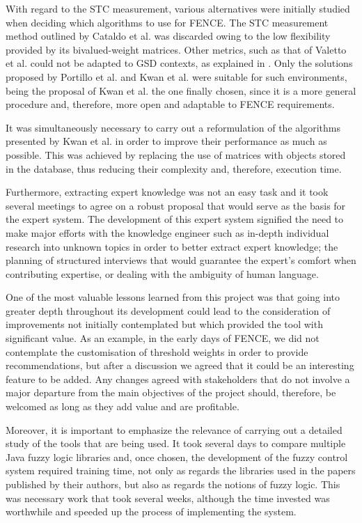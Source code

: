 With regard to the STC measurement, various alternatives were initially studied when deciding which algorithms to use for FENCE. The STC measurement method outlined by Cataldo et al. \cite{cataldo_identification_2006, cataldo_socio-technical_2008} was discarded owing to the low flexibility provided by its bivalued-weight matrices. Other metrics, such as that of Valetto et al. \cite{valetto_using_2007} could not be adapted to GSD contexts, as explained in \cite{sierra_systematic_2018}. Only the solutions proposed by Portillo et al. \cite{portillo_2014} and Kwan et al. \cite{kwan_weighted_2009, kwan_does_2011} were suitable for such environments, being the proposal of Kwan et al. the one finally chosen, since it is a more general procedure and, therefore, more open and adaptable to FENCE requirements.

It was simultaneously necessary to carry out a reformulation of the algorithms presented by Kwan et al. in order to improve their performance as much as possible. This was achieved by replacing the use of matrices with objects stored in the database, thus reducing their complexity and, therefore, execution time.

Furthermore, extracting expert knowledge was not an easy task and it took several meetings to agree on a robust proposal that would serve as the basis for the expert system. The development of this expert system signified the need to make major efforts with the knowledge engineer such as in-depth individual research into unknown topics in order to better extract expert knowledge; the planning of structured interviews that would guarantee the expert's comfort when contributing expertise, or dealing with the ambiguity of human language.

One of the most valuable lessons learned from this project was that going into greater depth throughout its development could lead to the consideration of improvements not initially contemplated but which provided the tool with significant value. As an example, in the early days of FENCE, we did not contemplate the customisation of threshold weights in order to provide recommendations, but after a discussion we agreed that it could be an interesting feature to be added. Any changes agreed with stakeholders that do not involve a major departure from the main objectives of the project should, therefore, be welcomed as long as they add value and are profitable.

Moreover, it is important to emphasize the relevance of carrying out a detailed study of the tools that are being used. It took several days to compare multiple Java fuzzy logic libraries and, once chosen, the development of the fuzzy control system required training time, not only as regards the libraries used in the papers published by their authors, but also as regards the notions of fuzzy logic. This was necessary work that took several weeks, although the time invested was worthwhile and speeded up the process of implementing the system.

